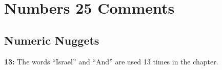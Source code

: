 \section{Numbers 25 Comments}

\subsection{Numeric Nuggets}
\textbf{13: } The words ``Israel'' and ``And'' are used 13 times in the chapter.


